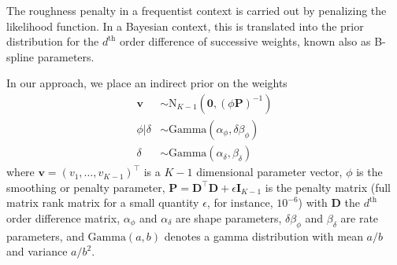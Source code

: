 \documentclass[aps,reprint,amsmath,amssymb,showpacs,showkeys]{revtex4-1}%
\begin{document}
The roughness penalty in a frequentist context is carried out by penalizing the likelihood function.  In a Bayesian context, this is translated into the prior distribution \citep{Lang:2004} for the $d^{\text{th}}$ order difference of successive weights, known also as B-spline parameters.  

In our approach, we place an indirect prior on the weights
\begin{align*}
\bm{v}&\sim\text{N}_{K-1}(\bm{0}, (\phi \bm{P})^{-1})\\
\phi|\delta &\sim \text{Gamma}(\alpha_{\phi}, \delta \beta_{\phi})\\
\delta &\sim \text{Gamma}(\alpha_{\delta}, \beta_{\delta})
\end{align*}
where $\bm{v} = (v_1,\dots,v_{K-1})^\top$ is a $K-1$ dimensional parameter vector, $\phi$ is the smoothing or penalty parameter, $\textbf{P} = \textbf{D}^\top \textbf{D} +\epsilon \textbf{I}_{K-1}$ is the penalty matrix (full matrix rank matrix for a small quantity $\epsilon$, for instance, $10^{-6}$) with $\textbf{D}$ the $d^{\text{th}}$ order difference matrix, $\alpha_{\phi}$ and $\alpha_{\delta}$ are shape parameters, $\delta \beta_{\phi}$ and $\beta_{\delta}$ are rate parameters, and $\text{Gamma}(a,b)$ denotes a gamma distribution with mean $a/b$ and variance $a/b^2$.
\end{document}
